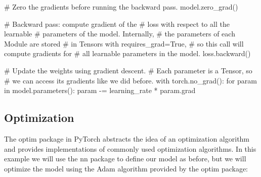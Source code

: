 \documentclass[11pt]{article}
\begin{document}
\begin{python}
    # Zero the gradients before running the backward pass.
    model.zero_grad()

    # Backward pass: compute gradient of the 
    # loss with respect to all the learnable
    # parameters of the model. Internally, 
    # the parameters of each Module are stored
    # in Tensors with requires_grad=True, 
    # so this call will compute gradients for
    # all learnable parameters in the model.
    loss.backward()

    # Update the weights using gradient descent. 
    # Each parameter is a Tensor, so
    # we can access its gradients like we did before.
    with torch.no_grad():
        for param in model.parameters():
            param -= learning_rate * param.grad
\end{python}{}
\clearpage
\subsection{Optimization}
The optim package in PyTorch abstracts the idea of an optimization algorithm and provides implementations of commonly used optimization algorithms.
In this example we will use the nn package to define our model as before, but we will optimize the model using the Adam algorithm provided by the optim package:
\end{document}
